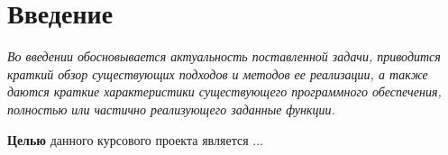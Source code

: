 \chapter*{Введение}

\textit{Во введении обосновывается актуальность поставленной задачи, приводится краткий обзор существующих подходов и методов ее реализации, а также даются краткие характеристики
существующего программного обеспечения, полностью или частично реализующего заданные функции.}

\textbf{Целью} данного курсового проекта является ...

%
